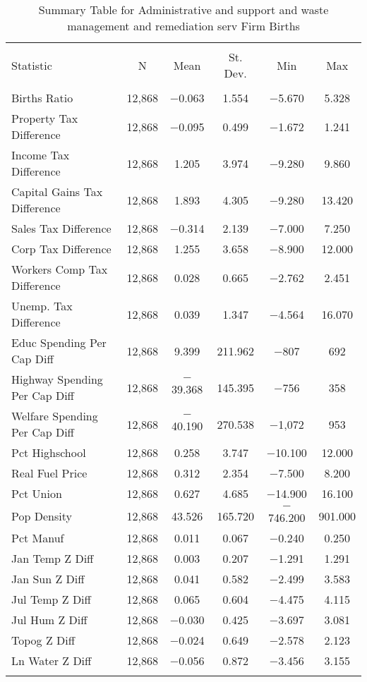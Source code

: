 
\begin{table}[!htbp] \centering 
  \caption{Summary Table for  Administrative and support and waste management and remediation serv Firm Births} 
  \label{56summary} 
\begin{tabular}{@{\extracolsep{5pt}}lccccc} 
\\[-1.8ex]\hline 
\hline \\[-1.8ex] 
Statistic & \multicolumn{1}{c}{N} & \multicolumn{1}{c}{Mean} & \multicolumn{1}{c}{St. Dev.} & \multicolumn{1}{c}{Min} & \multicolumn{1}{c}{Max} \\ 
\hline \\[-1.8ex] 
Births Ratio & 12,868 & $-$0.063 & 1.554 & $-$5.670 & 5.328 \\ 
Property Tax Difference & 12,868 & $-$0.095 & 0.499 & $-$1.672 & 1.241 \\ 
Income Tax Difference & 12,868 & 1.205 & 3.974 & $-$9.280 & 9.860 \\ 
Capital Gains Tax Difference & 12,868 & 1.893 & 4.305 & $-$9.280 & 13.420 \\ 
Sales Tax Difference & 12,868 & $-$0.314 & 2.139 & $-$7.000 & 7.250 \\ 
Corp Tax Difference & 12,868 & 1.255 & 3.658 & $-$8.900 & 12.000 \\ 
Workers Comp Tax Difference & 12,868 & 0.028 & 0.665 & $-$2.762 & 2.451 \\ 
Unemp. Tax Difference & 12,868 & 0.039 & 1.347 & $-$4.564 & 16.070 \\ 
Educ Spending Per Cap Diff & 12,868 & 9.399 & 211.962 & $-$807 & 692 \\ 
Highway Spending Per Cap Diff & 12,868 & $-$39.368 & 145.395 & $-$756 & 358 \\ 
Welfare Spending Per Cap Diff & 12,868 & $-$40.190 & 270.538 & $-$1,072 & 953 \\ 
Pct Highschool & 12,868 & 0.258 & 3.747 & $-$10.100 & 12.000 \\ 
Real Fuel Price & 12,868 & 0.312 & 2.354 & $-$7.500 & 8.200 \\ 
Pct Union & 12,868 & 0.627 & 4.685 & $-$14.900 & 16.100 \\ 
Pop Density & 12,868 & 43.526 & 165.720 & $-$746.200 & 901.000 \\ 
Pct Manuf & 12,868 & 0.011 & 0.067 & $-$0.240 & 0.250 \\ 
Jan Temp Z Diff & 12,868 & 0.003 & 0.207 & $-$1.291 & 1.291 \\ 
Jan Sun Z Diff & 12,868 & 0.041 & 0.582 & $-$2.499 & 3.583 \\ 
Jul Temp Z Diff & 12,868 & 0.065 & 0.604 & $-$4.475 & 4.115 \\ 
Jul Hum Z Diff & 12,868 & $-$0.030 & 0.425 & $-$3.697 & 3.081 \\ 
Topog Z Diff & 12,868 & $-$0.024 & 0.649 & $-$2.578 & 2.123 \\ 
Ln Water Z Diff & 12,868 & $-$0.056 & 0.872 & $-$3.456 & 3.155 \\ 
\hline \\[-1.8ex] 
\end{tabular} 
\end{table} 
